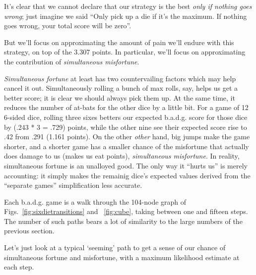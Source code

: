 \documentclass[11pt, oneside]{article} 	%
\begin{document}
It's clear that we cannot declare that our strategy is the best \emph{only if nothing goes wrong}; just imagine we said ``Only pick up a die if it's the maximum.  If nothing goes wrong, your total score will be zero''.

But we'll focus on approximating the amount of pain we'll endure with this strategy, on top of the 3.307 points.  In particular, we'll focus on approximating the contribution of \emph{simultaneous misfortune}.

\emph{Simultaneous fortune} at least has two countervailing factors which may help cancel it out.  Simultaneously rolling a bunch of max rolls, say, helps us get a better score; it is clear we should always pick them up.  At the same time, it reduces the number of at-bats for the other dice by a little bit.   For a game of 12 6-sided dice, rolling three sixes betters our expected b.a.d.g. score for those dice by (.243 * 3 = .729) points, while the other nine see their expected score rise to .42 from .291 (1.161 points).  On the other \emph{other} hand, big jumps make the game shorter, and a shorter game has a smaller chance of the misfortune that actually does damage to us (makes us eat points), \emph{simultaneous misfortune}.  In reality, simultaneous fortune is an unalloyed good.  The only way it ``hurts us'' is merely accounting: it simply makes the remainig dice's expected values derived from  the ``separate games''  simplification less accurate.

Each b.a.d.g. game is a walk through the 104-node graph of Figs.~\ref{fig:sixdietransitions} and ~\ref{fig:cube}, taking between one and fifteen steps.  The number of such paths bears a lot of similarity to the large numbers of the previous section.  

Let's just look at a typical `seeming' path to get a sense of our chance of simultaneous fortune and misfortune, with a maximum likelihood estimate at each step.
\end{document}
